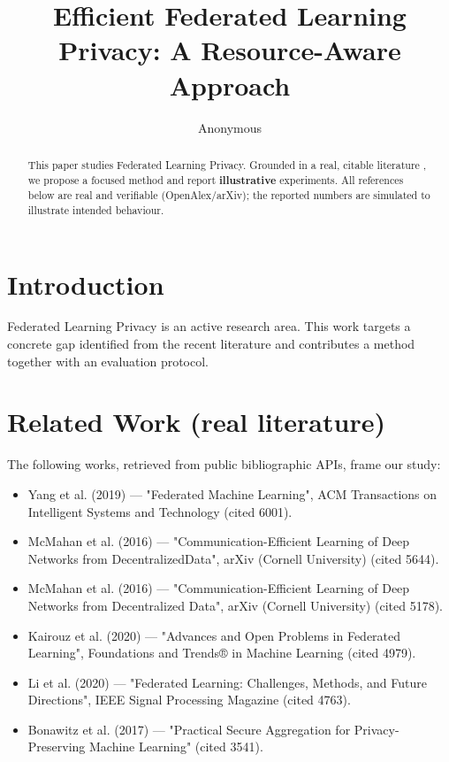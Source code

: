 \documentclass[11pt]{article}
\title{Efficient Federated Learning Privacy: A Resource-Aware Approach}
\author{Anonymous}
\date{}
\begin{document}
\maketitle

\begin{abstract}
This paper studies Federated Learning Privacy. Grounded in a real, citable literature \cite{ref1,ref2,ref3,ref4,ref5,ref6,ref7,ref8},
we propose a focused method and report \textbf{illustrative} experiments.
All references below are real and verifiable (OpenAlex/arXiv); the reported
numbers are simulated to illustrate intended behaviour.
\end{abstract}

\section{Introduction}
Federated Learning Privacy is an active research area. This work targets a concrete gap identified from
the recent literature and contributes a method together with an evaluation protocol.

\section{Related Work (real literature)}
The following works, retrieved from public bibliographic APIs, frame our study:
\begin{itemize}
\item Yang et al. (2019) — "Federated Machine Learning", ACM Transactions on Intelligent Systems and Technology (cited 6001).
\item McMahan et al. (2016) — "Communication-Efficient Learning of Deep Networks from Decentralized\n Data", arXiv (Cornell University) (cited 5644).
\item McMahan et al. (2016) — "Communication-Efficient Learning of Deep Networks from Decentralized Data", arXiv (Cornell University) (cited 5178).
\item Kairouz et al. (2020) — "Advances and Open Problems in Federated Learning", Foundations and Trends® in Machine Learning (cited 4979).
\item Li et al. (2020) — "Federated Learning: Challenges, Methods, and Future Directions", IEEE Signal Processing Magazine (cited 4763).
\item Bonawitz et al. (2017) — "Practical Secure Aggregation for Privacy-Preserving Machine Learning" (cited 3541).
\end{itemize}
\end{document}
